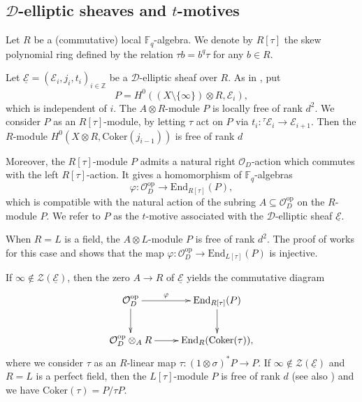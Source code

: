 \documentclass[10pt]{amsart}
\theoremstyle{plain}
\theoremstyle{definition}
\newcommand{\Coker}{\mathrm{Coker}}
\newcommand{\End}{\mathrm{End}}
\newcommand{\opp}{\mathrm{op}}
\newcommand{\cE}{\mathcal{E}}
\newcommand{\cO}{\mathcal{O}}
\newcommand{\cZ}{\mathcal{Z}}
\newcommand{\ucE}{\underline{\mathcal{E}}}
\newcommand{\bF}{\mathbb{F}}
\newcommand{\bZ}{\mathbb{Z}}
\newcommand{\sD}{\mathscr{D}}
\begin{document}

\subsection{$\sD$-elliptic sheaves and $t$-motives}\label{SubsecTMotives}


Let $R$ be a (commutative) local $\bF_q$-algebra. 
We denote by $R[\tau]$ the skew polynomial ring defined by the relation $\tau b=b^q\tau$ for any $b\in R$.

Let $\ucE=(\cE_i,j_i,t_i)_{i\in \bZ}$ be a $\sD$-elliptic sheaf over $R$. As in \cite[(3.4)]{LRS}, put
\[
P=H^0((X\setminus\{\infty\})\otimes R, \cE_i),
\]
which is independent of $i$. The $A\otimes R$-module $P$ is locally free of rank $d^2$.
We consider $P$ as an $R[\tau]$-module, by letting $\tau$ act on $P$ via $t_i:{}^\tau\!\cE_i\to \cE_{i+1}$. 
Then the $R$-module $H^0(X\otimes R,\Coker(j_{i-1}))$ is free of rank $d$


Moreover, the $R[\tau]$-module $P$ admits a natural right $\cO_D$-action which commutes with the left $R[\tau]$-action.
It gives a homomorphism of $\bF_q$-algebras
\[
\varphi:\cO_D^\opp\to \End_{R[\tau]}(P),
\]
which is compatible with the natural action of the subring $A\subseteq \cO_D^\opp$ on the $R$-module $P$. 
We refer to $P$ as the $t$-motive associated with the $\sD$-elliptic sheaf $\ucE$.

When $R=L$ is a field, the $A\otimes L$-module $P$ is free of rank $d^2$.
The proof of \cite[Lemma 3.7]{LRS} works for this case and shows that the map $\varphi:\cO_D^\opp\to \End_{L[\tau]}(P)$ is injective.

If $\infty\notin \cZ(\ucE)$, then the zero $A\to R$ of $\ucE$ yields the commutative diagram
\begin{equation}\label{DiagVarphi}
	\xymatrix{
		\cO_D^\opp \ar[r]^-{\varphi}\ar[d]& \End_{R[\tau]}(P)\ar[d]\\
		\cO_D^\opp\otimes_A R \ar[r]&  \End_{R}(\Coker(\tau)),
	}
\end{equation}
where we consider $\tau$ as an $R$-linear map $\tau: (1\otimes \sigma)^*P\to P$.
If $\infty\notin \cZ(\ucE)$ and $R=L$ is a perfect field, then the $L[\tau]$-module $P$ is free of rank $d$ \cite[Lemma 3.5]{LRS}
(see also \cite[Proposition 1.4.4]{Anderson})
and we have $\Coker(\tau)=P/\tau P$.
\end{document}
